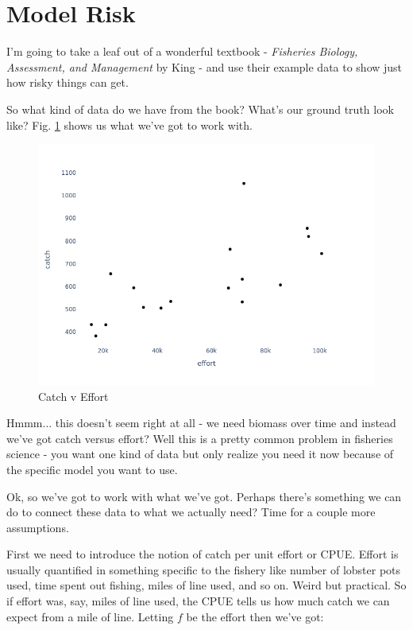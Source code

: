 \documentclass[11pt,a5paper]{book}
\begin{document}
\section{Model Risk}

I'm going to take a leaf out of a wonderful textbook - \textit{Fisheries Biology, Assessment, and Management} by King - and use their example data to show just how risky things can get. 
\newline

So what kind of data do we have from the book? What's our ground truth look like? Fig. \ref{fig:catch_v_effort} shows us what we've got to work with. 
\newline

\begin{figure}[h!] 
  \includegraphics[width=\linewidth]{notebooks/SurplusModels/measurements.png}
  \caption{Catch v Effort}
  \label{fig:catch_v_effort}
\end{figure}

Hmmm... this doesn't seem right at all - we need biomass over time and instead we've got catch versus effort? Well this is a pretty common problem in fisheries science - you want one kind of data but only realize you need it now because of the specific model you want to use. 
\newline

Ok, so we've got to work with what we've got. Perhaps there's something we can do to connect these data to what we actually need? Time for a couple more assumptions.
\newline

First we need to introduce the notion of catch per unit effort or CPUE. Effort is usually quantified in something specific to the fishery like number of lobster pots used, time spent out fishing, miles of line used, and so on. Weird but practical. So if effort was, say, miles of line used, the CPUE tells us how much catch we can expect from a mile of line. Letting $f$ be the effort then we've got:
\end{document}
